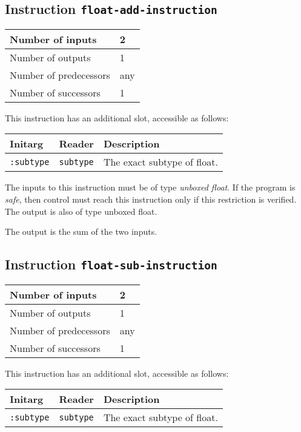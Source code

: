 \subsection{Instruction \texttt{float-add-instruction}}
\label{hir-instruction-float-add}

\begin{tabular}{|l|l|}
\hline
Number of inputs & 2\\
\hline
Number of outputs & 1\\
\hline
Number of predecessors & any\\
\hline
Number of successors & 1\\
\hline
\end{tabular}

This instruction has an additional slot, accessible as follows:

\begin{tabular}{|l|l|l|}
  \hline
  Initarg & Reader & Description\\
  \hline\hline
  \texttt{:subtype} & \texttt{subtype} & The exact subtype of float.\\
  \hline
\end{tabular}

The inputs to this instruction must be of type \emph{unboxed
  float}.  If the program is \emph{safe}, then control must reach this
instruction only if this restriction is verified.  The output is also
of type unboxed float.

The output is the sum of the two inputs.

\subsection{Instruction \texttt{float-sub-instruction}}
\label{hir-instruction-float-sub}

\begin{tabular}{|l|l|}
\hline
Number of inputs & 2\\
\hline
Number of outputs & 1\\
\hline
Number of predecessors & any\\
\hline
Number of successors & 1\\
\hline
\end{tabular}

This instruction has an additional slot, accessible as follows:

\begin{tabular}{|l|l|l|}
  \hline
  Initarg & Reader & Description\\
  \hline\hline
  \texttt{:subtype} & \texttt{subtype} & The exact subtype of float.\\
  \hline
\end{tabular}

